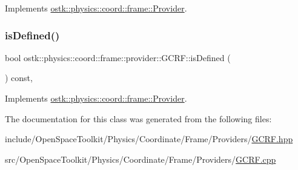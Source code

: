 Implements \hyperlink{classostk_1_1physics_1_1coord_1_1frame_1_1_provider_a38b86a589f46f8b8a9c97ab2776f37d1}{ostk\+::physics\+::coord\+::frame\+::\+Provider}.

\mbox{\label{classostk_1_1physics_1_1coord_1_1frame_1_1provider_1_1_g_c_r_f_a02160b74124b3ece74912c62aae5caaa}} 
\subsubsection{\texorpdfstring{is\+Defined()}{isDefined()}}
{\footnotesize\ttfamily bool ostk\+::physics\+::coord\+::frame\+::provider\+::\+G\+C\+R\+F\+::is\+Defined (\begin{DoxyParamCaption}{ }\end{DoxyParamCaption}) const\hspace{0.3cm}{\ttfamily [override]}, {\ttfamily [virtual]}}



Implements \hyperlink{classostk_1_1physics_1_1coord_1_1frame_1_1_provider_a27acab0012649796b97956fed1a91493}{ostk\+::physics\+::coord\+::frame\+::\+Provider}.



The documentation for this class was generated from the following files\+:\begin{DoxyCompactItemize}
\item 
include/\+Open\+Space\+Toolkit/\+Physics/\+Coordinate/\+Frame/\+Providers/\hyperlink{_g_c_r_f_8hpp}{G\+C\+R\+F.\+hpp}\item 
src/\+Open\+Space\+Toolkit/\+Physics/\+Coordinate/\+Frame/\+Providers/\hyperlink{_g_c_r_f_8cpp}{G\+C\+R\+F.\+cpp}\end{DoxyCompactItemize}
